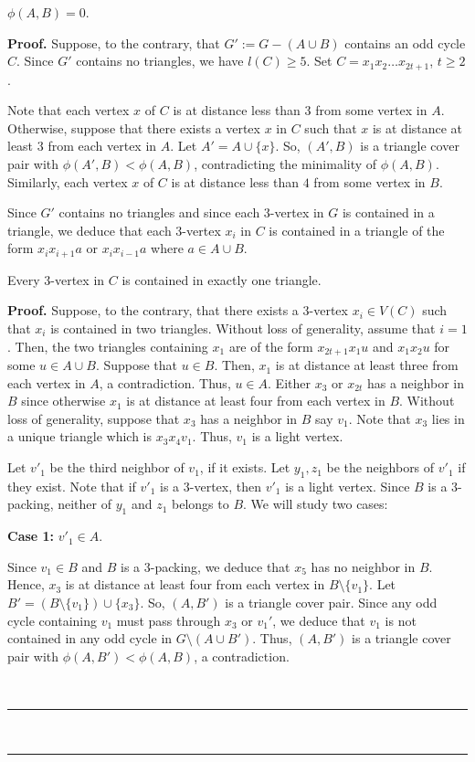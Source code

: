 \documentclass[10pt,a4paper]{amsart}
\newenvironment{proof}[1][Proof]{\textbf{#1.} }{\ \rule{0.5em}{0.5em}}
\begin{document}
\begin{lemma}\label{l7}
    $\phi(A,B)=0$.
\end{lemma}

\begin{proof}
Suppose, to the contrary, that $G' := G- (A\cup B)$ contains an odd cycle $C$. Since $G'$ contains no triangles, we have $l(C) \ge 5$. Set $C = x_1 x_2 \ldots x_{2t+1}$, $t\geq 2$.  

Note that each vertex $x$ of $C$ is at distance less than 3 from some vertex in $A$. Otherwise, suppose that there exists a vertex $x$ in $C$ such that $x$ is at distance at least $3$ from each vertex in $A$. Let $A'=A\cup \{x\}$. So, $(A', B)$ is a triangle cover pair with $\phi (A',B) < \phi (A,B)$, contradicting the minimality of $\phi(A,B)$. Similarly, each vertex $x$ of $C$ is at distance less than $4$ from some vertex in $B$. 

Since $G'$ contains no triangles and since each $3$-vertex in $G$ is contained in a triangle, we deduce that each $3$-vertex $x_i$ in $C$ is contained in a triangle of the form $x_ix_{i+1}a$ or $x_ix_{i-1}a$ where $a\in A\cup B$.

\begin{claim}
    Every $3$-vertex in $C$ is contained in exactly one triangle.
\end{claim}
\begin{proof}
    Suppose, to the contrary, that there exists a $3$-vertex $x_i\in V(C)$ such that $x_i$ is contained in two triangles. Without loss of generality, assume that $i=1$. Then, the two triangles containing $x_1$ are of the form $x_{2t+1}x_1u$ and $x_1x_2u$ for some $u\in A\cup B$. Suppose that $u\in B$. Then, $x_1$ is at distance at least three from each vertex in $A$, a contradiction. Thus, $u\in A$. Either $x_3$ or $x_{2t}$ has a neighbor in $B$ since otherwise $x_1$ is at distance at least four from each vertex in $B$. Without loss of generality, suppose that $x_3$ has a neighbor in $B$ say $v_1$. Note that $x_3$ lies in a unique triangle which is $x_3x_4v_1$. Thus, $v_1$ is a light vertex.
    
    Let $v'_1$ be the third neighbor of $v_1$, if it exists. Let $y_1,z_1$ be the neighbors of $v'_1$ if they exist. Note that if $v'_1$ is a $3$-vertex, then $v'_1$ is a light vertex. Since $B$ is a $3$-packing, neither of $y_1$ and $z_1$ belongs to $B$. We will study two cases:

\medskip
\noindent
\textbf{Case 1:} $v'_1\in A$.

Since $v_1\in B$ and $B$ is a $3$-packing, we deduce that $x_5$ has no neighbor in $B$. Hence, $x_3$ is at distance at least four from each vertex in $B\setminus \{v_1\}$. Let $B'=(B\setminus \{v_1\})\cup \{x_3\}$. So, $(A,B')$ is a triangle cover pair. Since any odd cycle containing $v_1$ must pass through $x_3$ or $v_1'$, we deduce that $v_1$ is not contained in any odd cycle in $G\setminus(A\cup B')$. Thus, $(A,B')$ is a triangle cover pair with $\phi (A,B') < \phi (A,B)$, a contradiction.


\end{proof}
\end{proof}
\end{document}
